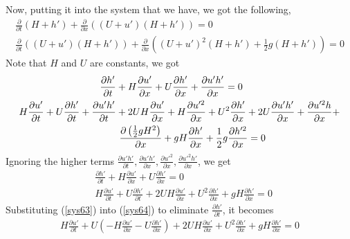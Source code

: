\documentclass{article}
\newcommand{\half}{\frac{1}{2}}
\theoremstyle{definition}
\begin{document}
    Now, putting it into the system that we have, we got the following,
    \begin{align}
        \frac{\partial}{\partial t} (H+h') + \frac{\partial}{\partial x}\left((U+u')(H+h')\right) = 0\\
        \frac{\partial}{\partial t} \left((U+u')(H+h')\right) 
                + \frac{\partial}{\partial x} \left((U+u')^2(H+h')
                        +\half g (H+h')    \right)=0
    \end{align}
    Note that $H$ and $U$ are constants, we got
    \begin{align}
        \frac{\partial h'}{\partial t} 
            &+ H \frac{\partial u'}{\partial x} 
            + U \frac{\partial h'}{\partial x} 
            + \frac{\partial u'h'}{\partial x} = 0 \\
        H \frac{\partial u'}{\partial t} 
            + U \frac{\partial h'}{\partial t} 
            + \frac{\partial u'h'}{\partial t}
               &+ 2UH \frac{\partial u'}{\partial x} 
                +   H \frac{\partial u'^2}{\partial x} 
                +  U^2\frac{\partial h'}{\partial x} 
                + 2U  \frac{\partial u'h'}{\partial x} 
                + \frac{\partial u'^2h}{\partial x} +  \notag                     \\
               &\  \frac{\partial \left(\half gH^2\right)}{\partial x} 
                + gH \frac{\partial h'}{\partial x} 
                + \half g \frac{\partial h'^2}{\partial x} =0
    \end{align}
    Ignoring the higher terms $\frac{\partial u'h'}{\partial t},
    \frac{\partial u'h'}{\partial x}, \frac{\partial u'^2}{\partial x},
    \frac{\partial u'^2h'}{\partial x}$, we get
    \begin{align}
        \label{sys63}
        &\frac{\partial h'}{\partial t} + H \frac{\partial u'}{\partial x} + U \frac{\partial h'}{\partial x} =0 \\
        \label{sys64}
        & H \frac{\partial u'}{\partial t} + U \frac{\partial h'}{\partial t} 
            + 2UH \frac{\partial u'}{\partial x} 
            +  U^2\frac{\partial h'}{\partial x}  
            + gH \frac{\partial h'}{\partial x} =0
    \end{align}
    Substituting (\ref{sys63}) into (\ref{sys64}) to eliminate $\frac{\partial h'}{\partial t}$, it becomes
    \begin{align}
        H \frac{\partial u'}{\partial t} 
            + U \left( - H \frac{\partial u'}{\partial x} - U \frac{\partial h'}{\partial x} \right)
            + 2UH \frac{\partial u'}{\partial x} 
            +  U^2\frac{\partial h'}{\partial x}  
            + gH \frac{\partial h'}{\partial x} =0
    \end{align} 
\end{document}
